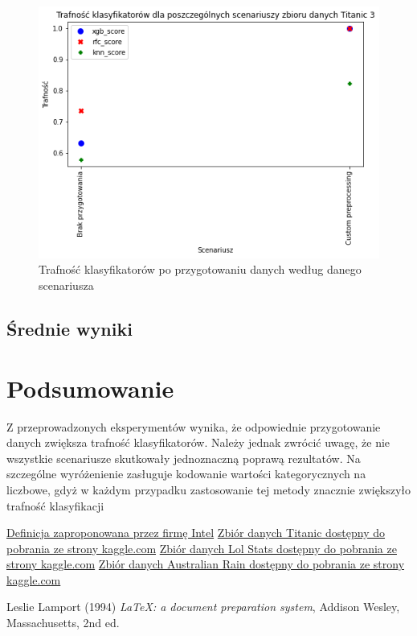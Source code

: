 \documentclass{book}
\begin{document}
\begin{figure}[H]
\centerline{\includegraphics{Titanic_3_Custom}}
\centering
\caption{Trafność klasyfikatorów po przygotowaniu danych 
według danego scenariusza}
\end{figure}


\section{Średnie wyniki}


\chapter{Podsumowanie}
Z przeprowadzonych eksperymentów wynika, 
że odpowiednie przygotowanie danych zwiększa trafność 
klasyfikatorów. Należy jednak zwrócić uwagę, że nie wszystkie 
scenariusze skutkowały jednoznaczną poprawą rezultatów. 
Na szczególne wyróżenienie zasługuje kodowanie wartości 
kategorycznych na liczbowe, gdyż w każdym przypadku zastosowanie 
tej metody znacznie zwiększyło trafność klasyfikacji

\begin{thebibliography}{9}
    \href{https://www.intel.pl/content/www/pl/pl/analytics/resources/what-is-data-analytics.html}{Definicja zaproponowana przez firmę Intel}
    \href{https://www.kaggle.com/competitions/titanic/data?select=train.csv}{Zbiór danych Titanic dostępny do pobrania ze strony kaggle.com}
    \href{https://www.kaggle.com/datasets/vivovinco/league-of-legends-stats-s13}{Zbiór danych Lol Stats dostępny do pobrania ze strony kaggle.com}
    \href{https://www.kaggle.com/datasets/jsphyg/weather-dataset-rattle-package}{Zbiór danych Australian Rain dostępny do pobrania ze strony kaggle.com}
    
    Leslie Lamport (1994) \emph{\LaTeX: a document preparation system}, Addison
    Wesley, Massachusetts, 2nd ed.
    \end{thebibliography}
\end{document}
